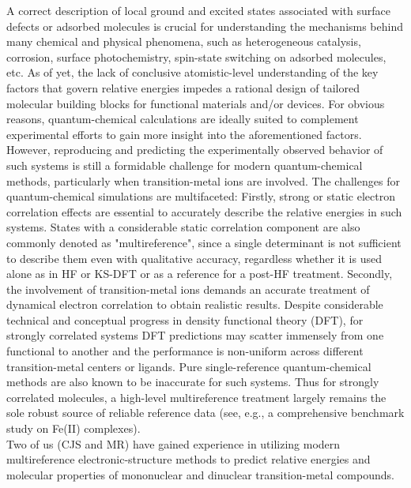 \documentclass[a4paper,11pt,headings=normal]{scrartcl}
\begin{document}
\begin{itemize}
A correct description of local ground and excited states 
associated with surface defects or adsorbed molecules is crucial for understanding 
the mechanisms 
behind many chemical and physical phenomena, such as heterogeneous catalysis, 
corrosion, surface photochemistry, spin-state switching on adsorbed molecules, 
etc. As of yet, the lack of conclusive atomistic-level understanding of the key 
factors that govern relative energies impedes a rational design 
of tailored molecular building blocks for functional materials and/or devices. 
For obvious reasons, quantum-chemical calculations are ideally suited to 
complement experimental efforts to gain more insight into the aforementioned 
factors. However, reproducing and predicting the experimentally observed behavior 
of such systems is still a formidable challenge for modern quantum-chemical 
methods, particularly when transition-metal ions are involved. The challenges for 
quantum-chemical simulations are multifaceted: Firstly, strong or static electron 
correlation effects are essential to accurately describe the relative energies 
in such systems.\autocite{Pierloot2018, Radon2018, Gagliardi2019a, Mauracher2020, 
Roemelt2021} States with a considerable 
static correlation component are also commonly denoted as "multireference", since a 
single determinant is not sufficient to describe them even with qualitative 
accuracy, regardless whether it is used alone as in HF or KS-DFT or as a reference 
for a post-HF treatment.  Secondly, the involvement of transition-metal
ions demands an accurate treatment of dynamical electron correlation 
to obtain realistic results.\autocite{Reiher2016, Pierloot2018, Roemelt2021} 
Despite considerable technical and conceptual progress in density functional 
theory (DFT), for strongly correlated systems DFT predictions may scatter 
immensely from one functional to another and the performance is non-uniform across 
different transition-metal centers or ligands. Pure single-reference quantum-chemical methods 
are also known to be inaccurate for such systems. Thus for 
strongly correlated molecules, a high-level multireference treatment largely 
remains the sole robust source of reliable reference data (see, e.g., a 
comprehensive benchmark study on Fe(II) complexes\autocite{Reimann_2022}).\\
Two of us (CJS and MR) have gained  experience in utilizing modern 
multireference electronic-structure methods to predict relative 
energies and molecular properties of mononuclear and dinuclear transition-metal 
compounds.\autocite{Pantazis2018, Krewald2019, Nam2024, Hirsch2025} 

\end{itemize}
\end{document}
